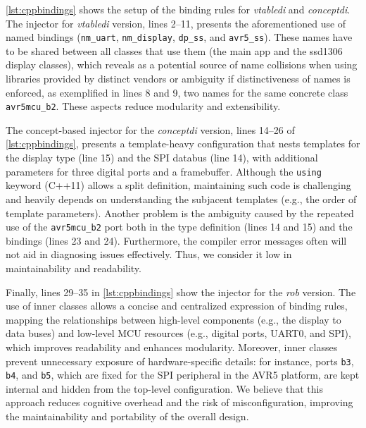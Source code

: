 \documentclass[10pt,sigplan,screen,anonymous]{acmart}
\begin{document}
\autoref{lst:cppbindings} shows the setup of the binding rules for \emph{vtabledi} and \emph{conceptdi}. The injector for \emph{vtabledi} version, lines 2--11, presents the aforementioned use of named bindings ({\tt nm\_uart}, {\tt nm\_display}, {\tt dp\_ss}, and {\tt avr5\_ss}). These names have to be shared between all classes that use them (the main app and the ssd1306 display classes), which reveals as a potential source of name collisions when using libraries provided by distinct vendors or ambiguity if distinctiveness of names is enforced, as exemplified in lines 8 and 9, two names for the same concrete class {\tt avr5mcu\_b2}. These aspects reduce modularity and extensibility.


The concept-based injector for the \emph{conceptdi} version, lines 14--26 of \autoref{lst:cppbindings}, presents a template-heavy configuration that nests templates for the display type (line 15) and the SPI databus (line 14), with additional parameters for three digital ports and a framebuffer. Although the {\tt using} keyword (C++11) allows a split definition, maintaining such code is challenging and heavily depends on understanding the subjacent templates (e.g., the order of template parameters). Another problem is the ambiguity caused by the repeated use of the {\tt avr5mcu\_b2} port both in the type definition (lines 14 and 15) and the bindings (lines 23 and 24). Furthermore, the compiler error messages often will not aid in diagnosing issues effectively. Thus, we consider it low in maintainability and readability.

Finally, lines 29--35 in \autoref{lst:cppbindings} show the injector for the \emph{rob} version. The use of inner classes allows a concise and centralized expression of binding rules, mapping the relationships between high-level components (e.g., the display to data buses) and low-level MCU resources (e.g., digital ports, UART0, and SPI), which improves readability and enhances modularity. Moreover, inner classes prevent unnecessary exposure of hardware-specific details: for instance, ports {\tt b3}, {\tt b4}, and {\tt b5}, which are fixed for the SPI peripheral in the AVR5 platform, are kept internal and hidden from the top-level configuration. We believe that this approach reduces cognitive overhead and the risk of misconfiguration, improving the maintainability and portability of the overall design.

\end{document}
